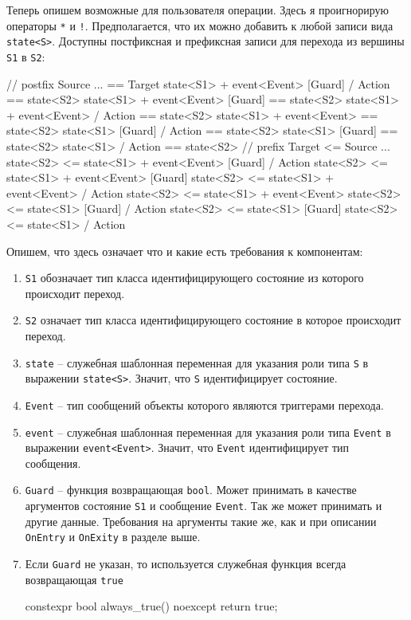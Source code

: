 \documentclass{article}
\begin{document}
{Теперь опишем возможные для пользователя операции.
Здесь я проигнорирую операторы \verb"*" и \verb"!".
Предполагается, что их можно добавить к любой записи вида \verb"state<S>".
Доступны постфиксная и префиксная записи для перехода из вершины \verb"S1" в \verb"S2":
\begin{cppcode}
// postfix Source ... == Target
state<S1> + event<Event> [Guard] / Action == state<S2>
state<S1> + event<Event> [Guard] == state<S2>
state<S1> + event<Event> / Action == state<S2>
state<S1> + event<Event>  == state<S2>
state<S1> [Guard] / Action == state<S2>
state<S1> [Guard]  == state<S2>
state<S1> / Action == state<S2>
// prefix Target <= Source ...
state<S2> <= state<S1> + event<Event> [Guard] / Action
state<S2> <= state<S1> + event<Event> [Guard]
state<S2> <= state<S1> + event<Event> / Action
state<S2> <= state<S1> + event<Event>
state<S2> <= state<S1> [Guard] / Action
state<S2> <= state<S1> [Guard]
state<S2> <= state<S1> / Action
\end{cppcode}
Опишем, что здесь означает что и какие есть требования к компонентам:
\begin{enumerate}
\item \verb"S1" обозначает тип класса идентифицирующего состояние из которого происходит переход.

\item \verb"S2" означает тип класса идентифицирующего состояние в которое происходит переход.

\item \verb"state" -- служебная шаблонная переменная для указания роли типа \verb"S" в выражении \verb"state<S>".
Значит, что \verb"S" идентифицирует состояние.

\item \verb"Event" -- тип сообщений объекты которого являются триггерами перехода.

\item \verb"event" -- служебная шаблонная переменная для указания роли типа \verb"Event" в выражении \verb"event<Event>".
Значит, что \verb"Event" идентифицирует тип сообщения.

\item \verb"Guard" --  функция возвращающая \verb"bool".
Может принимать в качестве аргументов состояние \verb"S1" и сообщение \verb"Event".
Так же может принимать и другие данные.
Требования на аргументы такие же, как и при описании \verb"OnEntry" и \verb"OnExity" в разделе выше.
\item Если \verb"Guard" не указан, то используется служебная функция всегда возвращающая \verb"true"
\begin{cppcode}[\nonumbers]
constexpr bool always_true() noexcept {
  return true;
}
\end{cppcode}


\end{enumerate}}
\end{document}
